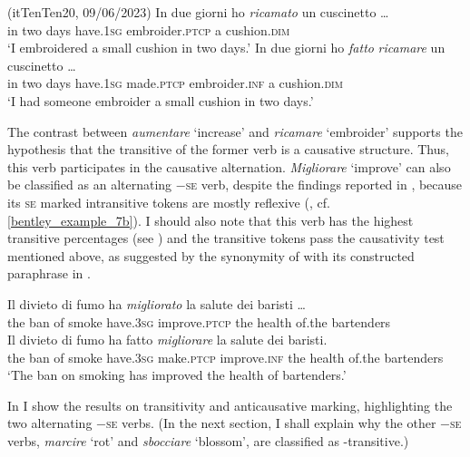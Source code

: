 \documentclass[output=paper,colorlinks,citecolor=brown
]{langscibook}
\begin{document}
\ea \label{bentley_example_11}(itTenTen20, 09/06/2023)
    \ea \label{bentley_example_11a}
    \gll In	due	giorni	ho						\textit{ricamato}						un cuscinetto \ldots  \\
    in	two	days			have.1\textsc{sg}	embroider.\textsc{ptcp}	a			cushion.\textsc{dim}\\
    \glt ‘I embroidered a small cushion in two days.’
    \ex \label{bentley_example_11b}
    \gll In	due	giorni	ho						\textit{fatto}						\textit{ricamare}					un	cuscinetto \ldots  \\
   	in	two	days			have.1\textsc{sg}	made.\textsc{ptcp}	embroider.\textsc{inf}		a			cushion.\textsc{dim} \\
    \glt ‘I had someone embroider a small cushion in two days.’
    \z
\z

The contrast between \textit{aumentare} ‘increase’ and \textit{ricamare} ‘embroider’ supports the hypothesis that the transitive of the former verb is a causative structure. Thus, this verb participates in the causative alternation. 
\textit{Migliorare} ‘improve’ can also be classified as an alternating −\textsc{se} verb, despite the findings reported in , because its \textsc{se} marked intransitive tokens are mostly reflexive (, cf. \ref{bentley_example_7b}). I should also note that this verb has the highest transitive percentages (see ) and the transitive tokens pass the causativity test mentioned above, as suggested by the synonymity of  with its constructed paraphrase in .

\ea \label{bentley_example_12}
    \ea \label{bentley_example_12a}
    \gll 	Il		divieto		di		fumo		ha							\textit{migliorato}				la		salute		dei				baristi \ldots  \\
    						the	ban				of		smoke	have.3\textsc{sg}		improve.\textsc{ptcp}		the	health	of.the		bartenders				\\
    \ex \label{bentley_example_12b}
    \gll Il		divieto		di		fumo		ha							fatto						\textit{migliorare} 	la 	salute 	dei			 baristi. \\
   	the	ban				of		smoke	have.3\textsc{sg}		make.\textsc{ptcp}	improve.\textsc{inf}	the	health	of.the		bartenders \\
    \glt 					‘The ban on smoking has improved the health of bartenders.’
    \z
\z

In  I show the results on transitivity and anticausative marking, highlighting the two alternating −\textsc{se} verbs. (In the next section, I shall explain why the other −\textsc{se} verbs, \textit{marcire} ‘rot’ and \textit{sbocciare} ‘blossom’, are classified as -transitive.)
\end{document}
